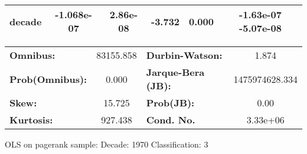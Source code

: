 \begin{center}
\begin{tabular}{lccccc}
\textbf{decade}             &   -1.068e-07  &     2.86e-08     &    -3.732  &         0.000        &     -1.63e-07 -5.07e-08       \\
\bottomrule
\end{tabular}
\begin{tabular}{lclc}
\textbf{Omnibus:}       & 83155.858 & \textbf{  Durbin-Watson:     } &       1.874     \\
\textbf{Prob(Omnibus):} &    0.000  & \textbf{  Jarque-Bera (JB):  } & 1475974628.334  \\
\textbf{Skew:}          &   15.725  & \textbf{  Prob(JB):          } &        0.00     \\
\textbf{Kurtosis:}      &  927.438  & \textbf{  Cond. No.          } &    3.33e+06     \\
\bottomrule
\end{tabular}
\end{center}
\break
OLS on pagerank sample: Decade: 1970 Classification: 3
